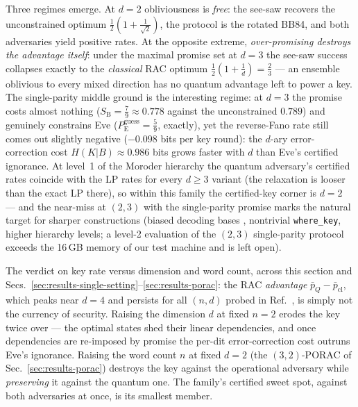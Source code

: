 \documentclass[aps,pra,twocolumn,superscriptaddress,longbibliography,nofootinbib]{revtex4-2}
\newcommand{\Eve}{\mathrm{E}}
\newcommand{\Bob}{\mathrm{B}}
\newcommand{\pguess}{P_{\Eve}^{\mathrm{guess}}}
\newcommand{\wherekey}{\texttt{where\_key}}
\begin{document}
Three regimes emerge. At $d=2$ obliviousness is \emph{free}: the
see-saw recovers the unconstrained optimum
$\tfrac12(1+\tfrac1{\sqrt2})$, the protocol is the rotated BB84, and
both adversaries yield positive rates. At the opposite extreme,
\emph{over-promising destroys the advantage itself}: under the maximal
promise set at $d=3$ the see-saw success collapses exactly to the
\emph{classical} RAC optimum $\tfrac12(1+\tfrac1d)=\tfrac23$ --- an
ensemble oblivious to every mixed direction has no quantum advantage
left to power a key. The single-parity middle ground is the
interesting regime: at $d=3$ the promise costs almost nothing
($S_{\Bob}=\tfrac79\approx0.778$ against the unconstrained $0.789$)
and genuinely constrains Eve ($\pguess=\tfrac59$, exactly), yet the
reverse-Fano rate still comes out slightly negative ($-0.098$ bits per
key round): the $d$-ary error-correction cost
$H(K|B)\approx0.986$ bits grows faster with $d$ than Eve's certified
ignorance. At level~1 of the Moroder hierarchy the quantum adversary's
certified rates coincide with the LP rates for every $d\ge3$ variant
(the relaxation is looser than the exact LP there), so within this
family the certified-key corner is $d=2$ --- and the near-miss at
$(2,3)$ with the single-parity promise marks the natural target for
sharper constructions (biased decoding bases
\cite{AmbainisBanik2019}, nontrivial \wherekey{}, higher hierarchy
levels; a level-2 evaluation of the $(2,3)$ single-parity protocol
exceeds the 16\,GB memory of our test machine and is left open).

The verdict on key rate versus dimension and word count, across this
section and Secs.~\ref{sec:results-single-setting}--\ref{sec:results-porac}:
the RAC \emph{advantage} $\bar p_{Q}-\bar p_{\mathrm{cl}}$, which
peaks near $d=4$ and persists for all $(n,d)$ probed in
Ref.~\cite{AmbainisKravchenko2024}, is simply not the currency of
security. Raising the dimension $d$ at fixed $n=2$ erodes the key
twice over --- the optimal states shed their linear dependencies, and
once dependencies are re-imposed by promise the per-dit
error-correction cost outruns Eve's ignorance. Raising the word count
$n$ at fixed $d=2$ (the $(3,2)$-PORAC of
Sec.~\ref{sec:results-porac}) destroys the key against the
operational adversary while \emph{preserving} it against the quantum
one. The family's certified sweet spot, against both adversaries at
once, is its smallest member.
\end{document}
